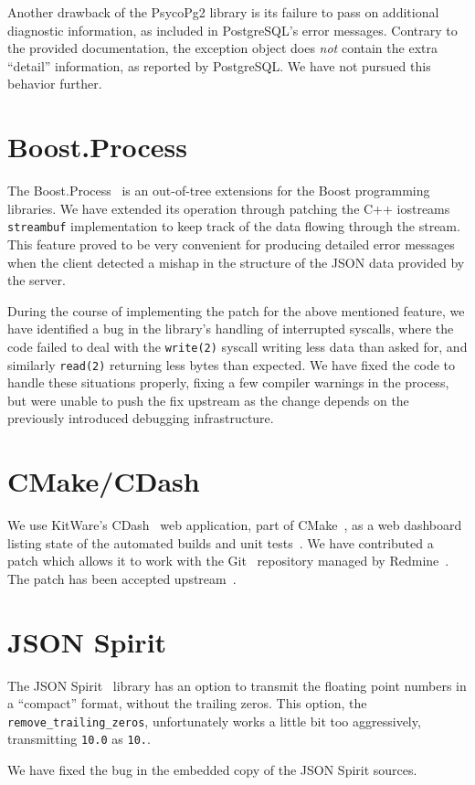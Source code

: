 \documentclass[deska]{subfiles}
\begin{document}
Another drawback of the PsycoPg2 library is its failure to pass on additional diagnostic information, as included in
PostgreSQL's error messages.  Contrary to the provided documentation, the exception object does {\em not} contain the
extra ``detail'' information, as reported by PostgreSQL.  We have not pursued this behavior further.

\section{Boost.Process}

The Boost.Process~\cite{boost-process} is an out-of-tree extensions for the Boost programming libraries.  We have
extended its operation through patching the C++ iostreams {\tt streambuf} implementation to keep track of the data
flowing through the stream.  This feature proved to be very convenient for producing detailed error messages when the
client detected a mishap in the structure of the JSON data provided by the server.

During the course of implementing the patch for the above mentioned feature, we have identified a bug in the library's
handling of interrupted syscalls, where the code failed to deal with the {\tt write(2)} syscall writing less data than
asked for, and similarly {\tt read(2)} returning less bytes than expected.  We have fixed the code to handle these
situations properly, fixing a few compiler warnings in the process, but were unable to push the fix upstream as the
change depends on the previously introduced debugging infrastructure.

\section{CMake/CDash}

We use KitWare's CDash~\cite{cmake-cdash} web application, part of CMake~\cite{cmake}, as a web dashboard listing state
of the automated builds and unit tests~\cite{deska-dashboard}.  We have contributed a patch which allows it to work with
the Git~\cite{git} repository managed by Redmine~\cite{redmine}.  The patch has been accepted
upstream~\cite{cdash-redmine-patch}.

\section{JSON Spirit}

The JSON Spirit~\cite{json-spirit} library has an option to transmit the floating point numbers in a ``compact'' format,
without the trailing zeros.  This option, the {\tt remove\_trailing\_zeros}, unfortunately works a little bit too
aggressively, transmitting {\tt 10.0} as {\tt 10.}.

We have fixed the bug in the embedded copy of the JSON Spirit sources.
\end{document}
